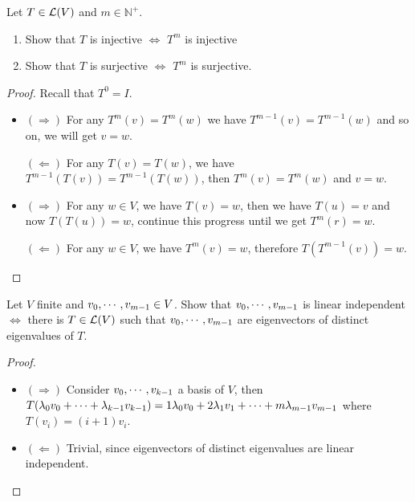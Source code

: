 \documentclass[../main.tex]{subfiles}
\begin{document}
\begin{exercise}
  Let $T \in \LT(V)$ and $m \in \mathbb{N}^+$.
  \begin{enumerate}
    \item Show that $T$ is injective $\iff$ $T^m$ is injective
    \item Show that $T$ is surjective $\iff$ $T^m$ is surjective.
  \end{enumerate}
\end{exercise}
\begin{proof}
  Recall that $T^0 = I$.
  \begin{itemize}
    \item $(\Rightarrow)$ For any $T^m(v) = T^m(w)$ we have $T^{m - 1}(v) = T^{m - 1}(w)$
          and so on, we will get $v = w$.

          $(\Leftarrow)$ For any $T(v) = T(w)$, we have $T^{m - 1}(T(v)) = T^{m - 1}(T(w))$,
          then $T^m(v) = T^m(w)$ and $v = w$.
    \item $(\Rightarrow)$ For any $w \in V$, we have $T(v) = w$,
          then we have $T(u) = v$ and now $T(T(u)) = w$, continue this progress
          until we get $T^{m}(r) = w$.

          $(\Leftarrow)$ For any $w \in V$, we have $T^{m}(v) = w$,
          therefore $T(T^{m - 1}(v)) = w$.
  \end{itemize}
\end{proof}

\begin{exercise}
  Let $V$ finite and $\join{v}{m - 1} \in V$.
  Show that $\join{v}{m - 1}$ is linear independent $\iff$
  there is $T \in \LT(V)$ such that $\join{v}{m - 1}$
  are eigenvectors of distinct eigenvalues of $T$.
\end{exercise}
\begin{proof}
  ~
  \begin{itemize}
    \item $(\Rightarrow)$ Consider $\join{v}{k - 1}$ a basis of $V$,
          then $T(\joinp[+]{\lambda}{v}{k - 1}) = 1\lambda_0v_0 + 2\lambda_1v_1 + \cdots + m\lambda_{m - 1}v_{m - 1}$
          where $T(v_i) = (i + 1)v_i$.
    \item $(\Leftarrow)$ Trivial, since eigenvectors of distinct eigenvalues are linear independent.
  \end{itemize}
\end{proof}
\end{document}
